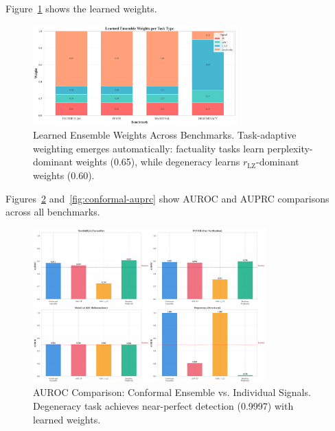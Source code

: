 \documentclass[11pt]{article}
\begin{document}
Figure~\ref{fig:conformal-weights} shows the learned weights.

\begin{figure}[h]
\centering
\includegraphics[width=0.7\textwidth]{figures/ensemble_weights_comparison.png}
\caption{Learned Ensemble Weights Across Benchmarks. Task-adaptive weighting emerges automatically: factuality tasks learn perplexity-dominant weights (0.65), while degeneracy learns $r_{\text{LZ}}$-dominant weights (0.60).}
\label{fig:conformal-weights}
\end{figure}

Figures~\ref{fig:conformal-auroc} and~\ref{fig:conformal-auprc} show AUROC and AUPRC comparisons across all benchmarks.

\begin{figure}[h]
\centering
\includegraphics[width=0.8\textwidth]{figures/auroc_comparison_conformal.png}
\caption{AUROC Comparison: Conformal Ensemble vs. Individual Signals. Degeneracy task achieves near-perfect detection (0.9997) with learned weights.}
\label{fig:conformal-auroc}
\end{figure}
\end{document}
